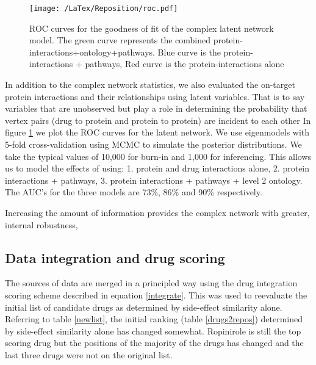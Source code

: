 \documentclass[preprint,12pt]{elsarticle}
\begin{document}
\begin{figure}[h]
  \begin{center}
	\centering \texttt{[image: /LaTex/Reposition/roc.pdf]} %
  \end{center}
\centering \caption{ROC curves for the goodness of fit of the complex latent network model. The green curve represents the combined protein-interactions+ontology+pathways. Blue curve is the protein-interactions + pathways, Red curve is the protein-interactions alone}
\label{roc}
\end{figure}

In addition to the complex network statistics, we also evaluated the on-target protein interactions and their relationships using latent variables. That is to say variables that are unobserved but play a role in determining the probability that vertex pairs (drug to protein and protein to protein) are incident to each other \cite{Kolaczyk2014}
In figure \ref{roc} we plot the ROC curves for the latent network. We use eigenmodels with 5-fold cross-validation using MCMC to simulate the posterior distributions. We take the typical values of 10,000 for burn-in and 1,000 for inferencing. This allows us to model the effects of using: 1. protein and drug interactions alone, 2. protein interactions + pathways, 3. protein interactions + pathways + level  2 ontology. The AUC's for the three models are 73\%, 86\% and 90\% respectively. 

Increasing the amount of information provides the complex network with greater, internal robustness, 

\subsection{Data integration and drug scoring}
The sources of data are merged in a principled way using the drug integration scoring scheme described in equation \ref{integrate}.  This was used to reevaluate the initial list of candidate drugs as determined by side-effect similarity alone. Referring to table \ref{newlist}, the initial ranking (table \ref{drugs2repos}) determined by side-effect similarity alone has changed somewhat. Ropinirole is still the top scoring drug but the positions of the majority of the drugs has changed and the last three drugs were not on the original list.
\end{document}
